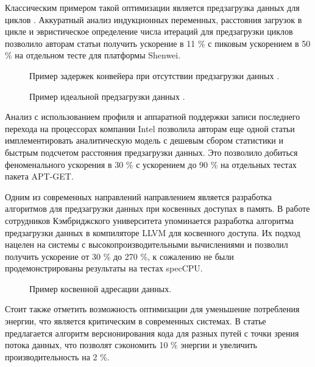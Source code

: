 Классическим примером такой оптимизации является предзагрузка данных для циклов \cite{chai2021implementation}. Аккуратный анализ индукционных переменных, расстояния загрузок в цикле и эвристическое определение числа итераций для предзагрузки циклов позволило авторам статьи \cite{chai2021implementation} получить ускорение в 11 \% с пиковым ускорением в 50 \%  на отдельном тесте для платформы Shenwei. 

 \begin{figure}[htbp]
	\centering
	
	\caption{Пример задержек конвейера при отсутствии предзагрузки данных \cite{chai2021implementation}.}
	\label{partReview:prefetch1}
\end{figure}

 \begin{figure}[htbp]
	\centering
	
	\caption{Пример идеальной предзагрузки данных \cite{chai2021implementation}.}
	\label{partReview:prefetch2}
\end{figure}

Анализ с использованием профиля и аппаратной поддержки записи последнего перехода на процессорах компании Intel позволила авторам еще одной статьи \cite{jamilan2022apt}  имплементировать аналитическую модель с дешевым сбором статистики и быстрым подсчетом расстояния предзагрузки данных. Это позволило добиться феноменального ускорения в 30 \% с ускорением до 90 \% на отдельных тестах пакета APT-GET. 

Одним из современных направлений направлением является разработка алгоритмов для предзагрузки данных при косвенных доступах в память. В работе сотрудников Кэмбриджского университета \cite{purkayastha2020llvm}  упоминается разработка алгоритма предзагрузки данных в компиляторе LLVM для косвенного доступа. Их подход нацелен на  системы с высокопроизводительными вычислениями и позволил получить ускорение от 30 \% до 270 \%, к сожалению не были продемонстрированы результаты на тестах specCPU.
 \begin{figure}[htbp]
	\centering
	
	\caption{Пример косвенной адресации данных.}
	\label{partReview:prefetch3}
\end{figure}
Стоит также отметить возможность оптимизации для уменьшение потребления энергии, что является критическим в современных системах. В статье \cite{ekemark2016static} предлагается алгоритм версионирования кода для разных путей с точки зрения потока данных, что позволят сэкономить 10 \% энергии и увеличить производительность на 2 \%.

